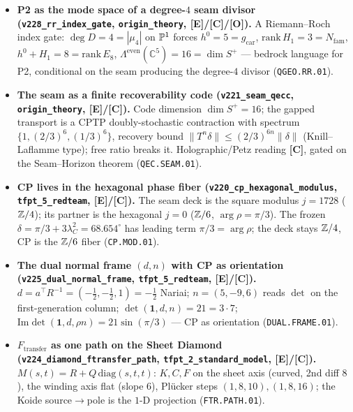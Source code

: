 \documentclass[11pt]{article}
\providecommand{\mE}{\textbf{[E]}}\providecommand{\mC}{\textbf{[C]}}
\providecommand{\mO}{\textbf{[O]}}\providecommand{\mX}{\textbf{[X]}}
\providecommand{\gcar}{g_{\mathrm{car}}}\providecommand{\Nfam}{N_{\mathrm{fam}}}
\begin{document}
\begin{itemize}
  $128{=}\mathrm{rank}\cdot\dim S^+$ (phase/glue channel); the red-team Target~D magnitude bijection
  lives in $120$, the un-covered CP phases in $128$; the dark-sector reading of $128$ stays Frontier
  (replaces the over-strong $S^-$ reading; \texttt{E8.CHAN.01}).
\item \textbf{P2 as the mode space of a degree-$4$ seam divisor (\texttt{v228\_rr\_index\_gate},
  \texttt{origin\_theory}, \mE/\mC/\mO).} A Riemann--Roch index gate: $\deg D{=}4{=}|\mu_4|$ on $\mathbb{P}^1$
  forces $h^0{=}5{=}\gcar$, $\mathrm{rank}\,H_1{=}3{=}\Nfam$, $h^0{+}H_1{=}8{=}\mathrm{rank}\,E_8$,
  $\Lambda^{\mathrm{even}}(\mathbb C^5){=}16{=}\dim S^+$ --- bedrock language for P2, conditional on the
  seam producing the degree-$4$ divisor (\texttt{QGEO.RR.01}).
\item \textbf{The seam as a finite recoverability code (\texttt{v221\_seam\_qecc},
  \texttt{origin\_theory}, \mE/\mC).} Code dimension $\dim S^+{=}16$; the gapped transport is a CPTP
  doubly-stochastic contraction with spectrum $\{1,(2/3)^6,(1/3)^6\}$, recovery bound
  $\|T^n\delta\|{\le}(2/3)^{6n}\|\delta\|$ (Knill--Laflamme type); free ratio breaks it. Holographic/Petz
  reading \mC, gated on the Seam--Horizon theorem (\texttt{QEC.SEAM.01}).
\item \textbf{CP lives in the hexagonal phase fiber (\texttt{v220\_cp\_hexagonal\_modulus},
  \texttt{tfpt\_5\_redteam}, \mE/\mC).} The seam deck is the square modulus $j{=}1728$ ($\mathbb{Z}/4$); its
  partner is the hexagonal $j{=}0$ ($\mathbb{Z}/6$, $\arg\rho{=}\pi/3$). The frozen $\delta{=}\pi/3{+}3\lambda_C^2
  {=}68.654^\circ$ has leading term $\pi/3{=}\arg\rho$; the deck stays $\mathbb{Z}/4$, CP is the $\mathbb{Z}/6$ fiber
  (\texttt{CP.MOD.01}).
\item \textbf{The dual normal frame $(d,n)$ with CP as orientation (\texttt{v225\_dual\_normal\_frame},
  \texttt{tfpt\_5\_redteam}, \mE/\mC).} $d{=}a^\top R^{-1}{=}({-}\tfrac12,{-}\tfrac12,1){=}{-}\tfrac12$
  Nariai; $n{=}(5,{-}9,6)$ reads $\det$ on the first-generation column; $\det(\mathbf1,d,n){=}21{=}3{\cdot}7$;
  $\mathrm{Im}\det(\mathbf1,d,\rho n){=}21\sin(\pi/3)$ --- CP as orientation (\texttt{DUAL.FRAME.01}).
\item \textbf{$F_{\mathrm{transfer}}$ as one path on the Sheet Diamond (\texttt{v224\_diamond\_ftransfer\_path},
  \texttt{tfpt\_2\_standard\_model}, \mE/\mC).} $M(s,t){=}R{+}Q\,\mathrm{diag}(s,t,t)$: $K,C,F$ on the
  sheet axis (curved, 2nd diff $8$), the winding axis flat (slope $6$), Pl\"ucker steps $(1,8,10),(1,8,16)$;
  the Koide source$\to$pole is the $1$-D projection (\texttt{FTR.PATH.01}).

\end{itemize}
\end{document}
